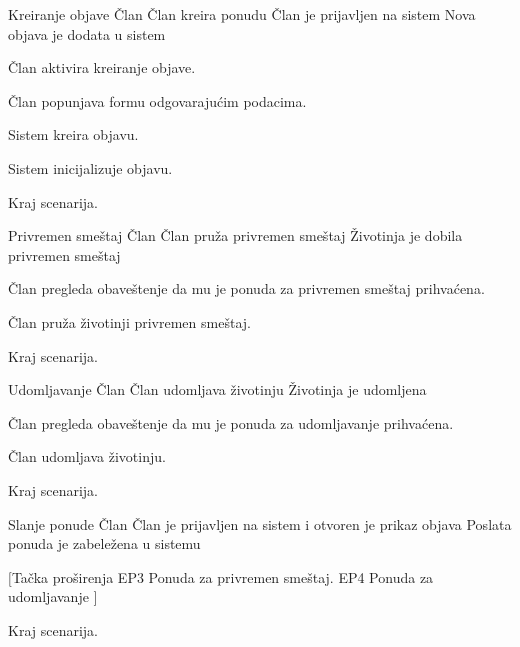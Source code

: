         {Kreiranje objave}
        {Član}
        {Član kreira ponudu}
        {Član je prijavljen na sistem}
        {Nova objava je dodata u sistem}
        {
            \item Član aktivira kreiranje objave.
            \item Član popunjava formu odgovarajućim podacima.
            \item Sistem kreira objavu. 
            \item Sistem inicijalizuje objavu.
            \item Kraj scenarija.
        }
        {}
        
        {Privremen smeštaj}
        {Član}
        {Član pruža privremen smeštaj}
        {}
        {Životinja je dobila privremen smeštaj}
        {
            \item Član pregleda obaveštenje da mu je ponuda za privremen smeštaj prihvaćena.
            \item Član pruža životinji privremen smeštaj.
            \item Kraj scenarija.
        }
        {}
        
        {Udomljavanje}
        {Član}
        {Član udomljava životinju}
        {}
        {Životinja je udomljena}
        {
            \item Član pregleda obaveštenje da mu je ponuda za udomljavanje prihvaćena.
            \item Član udomljava životinju.
            \item Kraj scenarija.
        }
        {}
        
        {Slanje ponude}
        {Član}
        {}
        {Član je prijavljen na sistem i otvoren je prikaz objava}
        {Poslata ponuda je zabeležena u sistemu}
        {
            \item $[$Tačka proširenja EP3 Ponuda za privremen smeštaj. EP4 Ponuda za udomljavanje $]$
            \item Kraj scenarija.
        }
        {}


